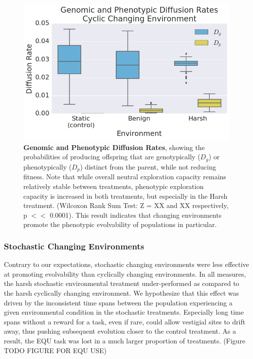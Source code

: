\documentclass[letterpaper]{article}
\begin{document}
\begin{figure}[h!] %
\begin{center}
\includegraphics[trim={0.2cm 0 0.4cm 0.25cm},clip,width=1\columnwidth]{figures/CCE_D_g_D_p__box.png}
\caption{\textbf{Genomic and Phenotypic Diffusion Rates}, showing the probabilities of producing offspring that are genotypically ($D_g$) or phenotypically ($D_p$) distinct from the parent, while 
not reducing fitness.
Note that while overall neutral exploration capacity remains relatively stable between treatments, phenotypic exploration capacity is increased in both treatments, but especially in the Harsh treatment. (Wilcoxon Rank Sum Test: Z = XX and XX respectively, p $<<$ 0.0001). This result indicates that changing environments promote the phenotypic evolvability of populations in particular.
}\label{fig:CCE_diffusion_rate}
\end{center}
\end{figure}
\subsubsection{Stochastic Changing Environments}

Contrary to our expectations, stochastic changing environments were less effective at promoting evolvability than cyclically changing environments. In all measures, the harsh stochastic environmental treatment under-performed as compared to the harsh cyclically changing environment. We hypothesize that this effect was driven by the inconsistent time spans between the population experiencing a given environmental condition in the stochastic treatments. Especially long time spans without a reward for a task, even if rare, could allow vestigial sites to drift away, thus pushing subsequent evolution closer to the control treatment. As a result, the EQU task was lost in a much larger proportion of treatments. (Figure~ TODO FIGURE FOR EQU USE)
\end{document}
